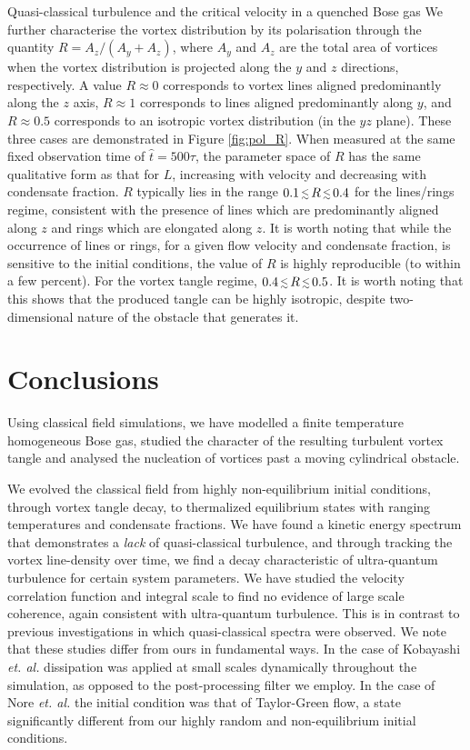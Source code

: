 \begin{chapter}{\label{cha:nonequib}Quasi-classical turbulence and the critical velocity in a quenched Bose gas}
We further characterise the vortex distribution by its polarisation through the quantity $R=A_z/(A_y+A_z)$, where $A_y$ and $A_z$ are the total area of vortices when the vortex distribution is projected along the $y$ and $z$ directions, respectively.  A value $R \approx 0$ corresponds to vortex lines aligned predominantly along the $z$ axis, $R\approx 1$ corresponds to lines aligned predominantly along $y$, and $R\approx 0.5$ corresponds to an isotropic vortex distribution (in the $yz$ plane). These three cases are demonstrated in Figure \ref{fig:pol_R}.  When measured at the same fixed observation time of $\hat{t}=500\tau$, the parameter space of $R$ has the same qualitative form as that for $L$, increasing with velocity and decreasing with condensate fraction. $R$ typically lies in the range $0.1 \,\mbox{\footnotesize$\lesssim$}\, R\,\mbox{\footnotesize$\lesssim$}\, 0.4$ for the lines/rings regime, consistent with the presence of lines which are predominantly aligned along $z$ and rings which are elongated along $z$.  It is worth noting that while the occurrence of lines or rings, for a given flow velocity and condensate fraction, is sensitive to the initial conditions, the value of $R$ is highly reproducible (to within a few percent). For the vortex tangle regime, $0.4 \,\mbox{\footnotesize$\lesssim$}\, R\,\mbox{\footnotesize$\lesssim$}\, 0.5$.  It is worth noting that this shows that the produced tangle can be highly isotropic, despite two-dimensional nature of the obstacle that generates it.
\section{Conclusions\label{sec:conclusions}}

Using classical field simulations, we have modelled a finite temperature homogeneous Bose gas, 
studied the character of the resulting turbulent vortex tangle and analysed the nucleation
of vortices past a moving cylindrical obstacle.

We evolved the classical field from highly non-equilibrium initial conditions, through vortex tangle decay, to thermalized equilibrium states with ranging temperatures and condensate fractions. We have found a kinetic energy spectrum that demonstrates a {\it lack} of quasi-classical turbulence, and through tracking the vortex line-density over time, we find a decay characteristic of ultra-quantum turbulence for certain system parameters. We have studied the velocity correlation function and integral scale to find no evidence of large scale coherence, again consistent with ultra-quantum turbulence. This is in contrast to previous investigations \cite{Nore,Kobayashi} in which quasi-classical spectra were observed. We note that these studies differ from ours in fundamental ways. In the case of Kobayashi {\it et. al.} dissipation was applied at small scales dynamically throughout the simulation, as opposed to the post-processing filter we employ. In the case of Nore {\it et. al.} the initial condition was that of Taylor-Green flow, a state significantly different from our highly random and non-equilibrium initial conditions.


\end{chapter}
